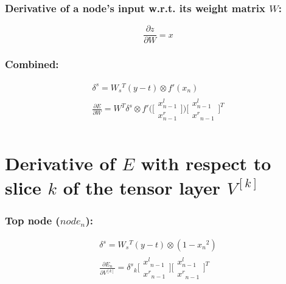 \documentclass{article}
\begin{document}
	\subsubsection*{Derivative of a node's input w.r.t. its weight matrix $W$:}
	\begin{equation}
		\frac{\partial z}{\partial W} = x
	\end{equation}
	\subsubsection*{Combined:}
	\begin{equation}
		\begin{split}
			\delta^s = W_s{^T}(y - t) \otimes f'(x_n) \\
			\frac{\partial E}{\partial W} = W^T \delta^s
			\otimes f' \bigg( \bigg[ \begin{array}{c} x_{n-1}^l \\ x_{n-1}^r \end{array} \bigg] \bigg) \bigg[  \begin{array}{c} x_{n-1}^l \\ x^{r}{_{n-1}} \end{array} \bigg]^T\\
		\end{split}
	\end{equation}

\section*{Derivative of $E$ with respect to slice $k$ of the tensor layer $V^{[k]}$}

	\subsubsection*{Top node ($node_n$):}
		\begin{equation}
			\begin{split}
				\delta^s = W_s{^T}(y - t) \otimes (1 - x{_n}^2) \\
				\frac{\partial E_n}{\partial V^{[k]}} = 
				\delta^s{_k} \bigg[ \begin{array}{c} x^l{_{n-1}} \\ x^r{_{n-1}} \end{array} \bigg]	
				\bigg[  \begin{array}{c} x_{n-1}^l \\ x^{r}{_{n-1}} \end{array} \bigg]^T \\
			\end{split}
		\end{equation}
\end{document}
